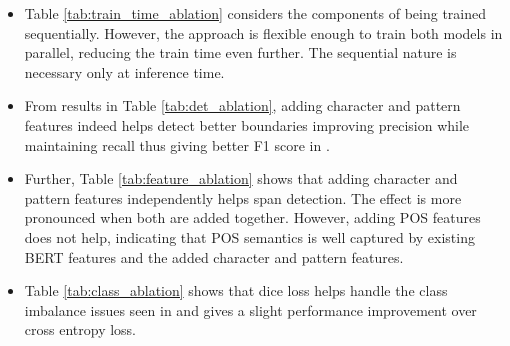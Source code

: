\begin{itemize}
    \item Table \ref{tab:train_time_ablation} considers the components of \modelname{} being trained sequentially. However, the approach is flexible enough to train both models in parallel, reducing the train time even further. The sequential nature is necessary only at inference time.
    
    
    \item From results in Table \ref{tab:det_ablation}, adding character and pattern features indeed helps detect better boundaries improving precision while maintaining recall thus giving better F1 score in \spandetect{}.
    
    \item Further, Table \ref{tab:feature_ablation} shows that adding character and pattern features independently helps span detection. The effect is more pronounced when both are added together. However, adding POS features does not help, indicating that POS semantics is well captured by existing BERT features and the added character and pattern features.
    
    \item Table \ref{tab:class_ablation} shows that dice loss helps handle the class imbalance issues seen in \spanclass{} and gives a slight performance improvement over cross entropy loss.
\end{itemize}

